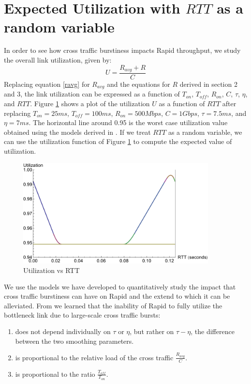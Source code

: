 \section{Expected Utilization with $RTT$ as a random variable}
  In order to see how cross traffic burstiness impacts Rapid throughput, we 
  study the overall link utilization, given by:
  \begin{equation}
    U = \frac{R_{avg} + R}{C}
    \label{util}
  \end{equation}
  Replacing equation \eqref{ravg} for $R_{avg}$ and the equations for $R$ 
  derived in section 2 and 3, the link utilization can be expressed as a 
  function of $T_{on}$, $T_{off}$, $R_{on}$, $C$, $\tau$, $\eta$, and $RTT$. 
  Figure \ref{utilvsrtt} shows a plot of the utilization $U$ as a function of 
  $RTT$ after replacing $T_{on} = 25 ms$, $T_{off} = 100 ms$, 
  $R_{on} = 500 Mbps$, $C = 1Gbps$, $\tau = 7.5 ms$, and $\eta = 7 ms$. The 
  horizontal line around 0.95 is the worst case utilization value obtained 
  using the models derived in \cite{Lovewell2011-Noise-TR}. If we treat 
  $RTT$ as a random variable, we can use the utilization function of Figure 
  \ref{utilvsrtt} to compute the expected value of utilization.
  \begin{figure}[h]
    \centering
    \includegraphics[width=0.9\textwidth]{img/utilvsrtt.pdf}
    \caption{Utilization vs RTT}
    \label{utilvsrtt}
  \end{figure}

  We use the models we have developed to quantitatively study the impact that 
  cross traffic burstiness can have on Rapid and the extend to which it can 
  be alleviated. From \cite{Lovewell2011-Noise-TR} we learned that the 
  inability of Rapid to fully utilize the bottleneck link due to large-scale 
  cross traffic bursts:
  \begin{enumerate}
    \item does not depend individually on $\tau$ or $\eta$, but rather on 
    $\tau - \eta$, the difference between the two smoothing parameters.

    \item is proportional to the relative load of the cross traffic 
    $\frac{R_{avg}}{C}$.

    \item is proportional to the ratio $\frac{T_{off}}{T_{on}}$.
  \end{enumerate}

